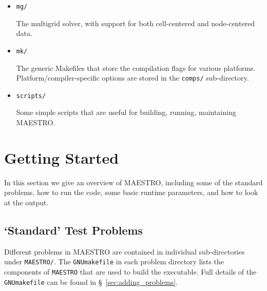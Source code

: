 \begin{itemize}
\begin{itemize}
 \end{itemize}

\item {\tt mg/}

  The multigrid solver, with support for both cell-centered and
  node-centered data.

\item {\tt mk/}

  The generic Makefiles that store the compilation flags for
  various platforms.  Platform/compiler-specific options are stored
  in the {\tt comps/} sub-directory.

\item {\tt scripts/}

  Some simple scripts that are useful for building, running,
  maintaining MAESTRO.

\end{itemize}





\section{Getting Started}

In this section we give an overview of MAESTRO, including some of the
standard problems, how to run the code, some basic runtime parameters,
and how to look at the output.


\subsection{`Standard' Test Problems}

Different problems in MAESTRO are contained in individual
sub-directories under {\tt MAESTRO/}.  The {\tt GNUmakefile}
in each problem directory lists the components of {\tt MAESTRO}
that are used to build the executable.  Full details of the
{\tt GNUmakefile} can be found in \S~\ref{sec:adding_problems}.


